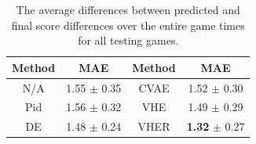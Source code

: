 \documentclass{article}
\begin{document}
\vspace{-0.1in}
\begin{table}[htbp]
    \centering
    \begin{tabular}{c|c|c|c}
    \hline
    Method  &  MAE &  Method  &  MAE\\\hline\hline
    N/A & 1.55 $\pm$ 0.35 & CVAE & 1.52 $\pm$ 0.30\\
    Pid & 1.56 $\pm$ 0.32 & VHE & 1.49 $\pm$ 0.29\\
    DE & 1.48 $\pm$ 0.24 & VHER & \textbf{1.32} $\pm$ 0.27\\ \hline
    \end{tabular}
    \vspace{-0.1in}
    \caption{The average differences between predicted and final score differences over the entire game times for all testing games.}
    \label{table:avg-diff}
\end{table}
\vspace{-0.2in}
\end{document}
